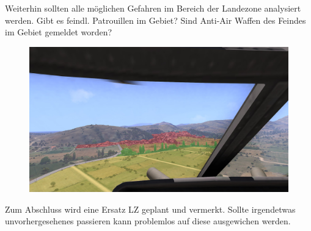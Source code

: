 	Weiterhin sollten alle möglichen Gefahren im Bereich der Landezone analysiert werden. Gibt es feindl. Patrouillen im Gebiet? Sind Anti-Air Waffen des Feindes im Gebiet gemeldet worden?
	\begin{figure}[htbp]
		\centering
		\includegraphics[width=0.95\linewidth]{./img/advanced/hubschrauber_+_infanterie/sicht-pilot}
	\end{figure}
			
	Zum Abschluss wird eine Ersatz \ac{LZ} geplant und vermerkt. Sollte irgendetwas unvorhergesehenes passieren kann problemlos auf diese ausgewichen werden.

